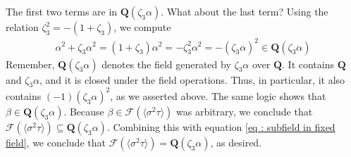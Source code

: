 \documentclass[oneside, english, 11pt]{article}
\newcommand{\fontField}[1]{\mathbf{#1}}
\newcommand{\fixedField}{\mathcal{F}}
\newcommand{\Q}{\rationals}
\newcommand{\rationals}{\fontField{Q}}
\begin{document}
The first two terms are in $\Q(\zeta_{3} \alpha)$. What about the last term? Using the relation $\zeta_{3}^{2} = -(1 + \zeta_{3})$, we compute
\begin{align*}
\alpha^{2} + \zeta_{3} \alpha^{2}
=
(1 + \zeta_{3}) \alpha^{2}
=
-\zeta_{3}^{2} \alpha^{2}
=
-(\zeta_{3} \alpha)^{2}
\in
\Q(\zeta_{3} \alpha)
\end{align*}
Remember, $\Q(\zeta_{3} \alpha)$ denotes the field generated by $\zeta_{3} \alpha$ over $\Q$. It contains $\Q$ and $\zeta_{3} \alpha$, and it is closed under the field operations. Thus, in particular, it also contains $(-1) (\zeta_{3} \alpha)^{2}$, as we asserted above. The same logic shows that $\beta \in \Q(\zeta_{3} \alpha)$. Because $\beta \in \fixedField(\langle{}\sigma^{2} \tau\rangle{})$ was arbitrary, we conclude that $\fixedField(\langle{}\sigma^{2} \tau\rangle{}) \subseteq \Q(\zeta_{3} \alpha)$. Combining this with equation \eqref{eq : subfield in fixed field}, we conclude that $\fixedField(\langle{}\sigma^{2} \tau\rangle{}) = \Q(\zeta_{3} \alpha)$, as desired.
\end{document}

